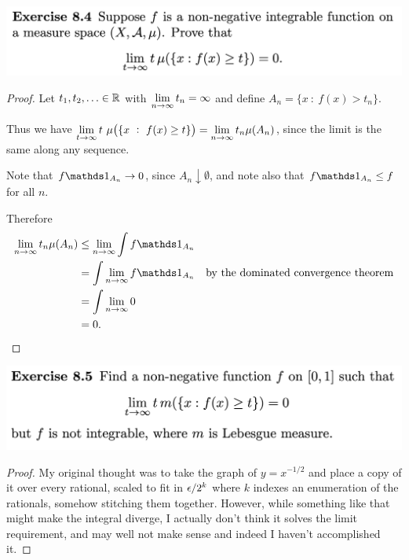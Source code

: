 \begin{mdframed}
\includegraphics[width=400pt]{img/analysis--berkeley-202a-hw09-210c.png}
\end{mdframed}

\begin{proof}
  Let $t_1, t_2, \ldots \in \mathbb{R}$ with $\limn t_n = \infty$ and define $A_n = \{x ~:~ f(x) > t_n\}$.

  Thus we have $\lim_{t\to\infty} t ~ \mu\big(\{x ~:~ f(x) \geq t\}\big) = \limn t_n \mu(A_n)$, since the limit
  is the same along any sequence.

  Note that $f\ind_{A_n} \to 0$, since $A_n \downarrow \emptyset$, and note also that $f\ind_{A_n} \leq f$ for
  all $n$.

  Therefore
  \begin{align*}
    \limn t_n \mu(A_n)
    &\leq \limn \int f\ind_{A_n} \\
    &= \int \limn f\ind_{A_n}             &\text{by the dominated convergence theorem}\\
    &= \int \limn 0 \\
    &= 0.
  \end{align*}
\end{proof}

\newpage
\begin{mdframed}
\includegraphics[width=400pt]{img/analysis--berkeley-202a-hw09-b0e8.png}
\end{mdframed}

\begin{proof}
  My original thought was to take the graph of $y = x^{-1/2}$ and place a copy of it over every rational,
  scaled to fit in $\epsilon/2^k$ where $k$ indexes an enumeration of the rationals, somehow stitching them
  together. However, while something like that might make the integral diverge, I actually don't think it
  solves the limit requirement, and may well not make sense and indeed I haven't accomplished it.
\end{proof}
\newpage

